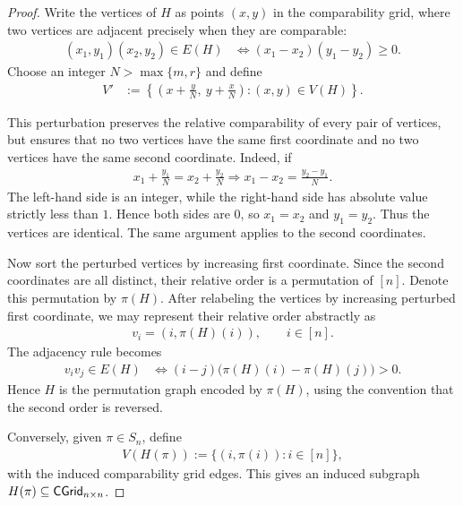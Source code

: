 \begin{proof}
Write the vertices of \(H\) as points \((x,y)\) in the comparability grid,
where two vertices are adjacent precisely when they are comparable:
\begin{align}
    (x_1,y_1)(x_2,y_2)\in E(H)
    &\iff (x_1-x_2)(y_1-y_2)\geq0.
\end{align}
Choose an integer $N > \max\{m,r\}$ and define
\begin{align}
    V'
    &:= \left\{
        \left(x+\frac{y}{N},\ y+\frac{x}{N}\right)
        : (x,y)\in V(H)
    \right\}.
\end{align}

This perturbation preserves the relative comparability of every pair of
vertices, but ensures that no two vertices have the same first coordinate and
no two vertices have the same second coordinate. Indeed, if
\begin{align}
    x_1+\frac{y_1}{N}
    = x_2+\frac{y_2}{N}
    \Rightarrow
    x_1-x_2
    = \frac{y_2-y_1}{N}.
\end{align}
The left-hand side is an integer, while the right-hand side has absolute value
strictly less than \(1\). Hence both sides are \(0\), so \(x_1=x_2\) and
\(y_1=y_2\). Thus the vertices are identical. The same argument applies to the
second coordinates.

Now sort the perturbed vertices by increasing first coordinate. Since the
second coordinates are all distinct, their relative order is a permutation of
\([n]\). Denote this permutation by \(\pi(H)\). After relabeling the vertices by increasing perturbed first coordinate, we may
represent their relative order abstractly as
\begin{align}
    v_i=(i,\pi(H)(i)), \qquad i\in[n].
\end{align}
The adjacency rule becomes
\begin{align}
    v_i v_j \in E(H)
    &\iff (i-j)\bigl(\pi(H)(i)-\pi(H)(j)\bigr)>0.
\end{align}
Hence \(H\) is the permutation graph encoded by \(\pi(H)\), using the convention
that the second order is reversed.

Conversely, given \(\pi\in S_n\), define
\begin{align}
    V(H(\pi)) := \{(i,\pi(i)) : i\in[n]\},
\end{align}
with the induced comparability grid edges. This gives an induced subgraph
\(H(\pi)\subseteq \mathsf{CGrid}_{n \times n}\).
\end{proof}

